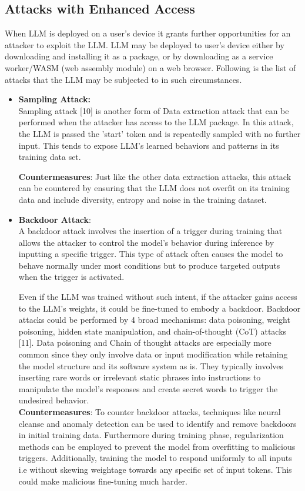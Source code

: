 \documentclass[12pt]{article}
\begin{document}
    \subsection{Attacks with Enhanced Access}
    When LLM is deployed on a user's device it grants further opportunities for an attacker to exploit the LLM. LLM may be deployed to user's device either by downloading and installing it as a package, or by downloading as a service worker/WASM (web assembly module) on a web browser. Following is the list of attacks that the LLM may be subjected to in such circumstances.
    \begin{itemize}
        \item \textbf{Sampling Attack:} \\
        Sampling attack [10] is another form of Data extraction attack that can be performed when the attacker has access to the LLM package. In this attack, the LLM is passed the 'start' token and is repeatedly sampled with no further input. This tends to expose LLM's learned behaviors and patterns in its training data set.

        \textbf{Countermeasures}: Just like the other data extraction attacks, this attack can be countered by ensuring that the LLM does not overfit on its training data and include diversity, entropy and noise in the training dataset.

        \item \textbf{Backdoor Attack}: \\
        A backdoor attack involves the insertion of a trigger during training that allows the attacker to control the model’s behavior during inference by inputting a specific trigger. This type of attack often causes the model to behave normally under most conditions but to produce targeted outputs when the trigger is activated.

        Even if the LLM was trained without such intent, if the attacker gains access to the LLM's weights, it could be fine-tuned to embody a backdoor. Backdoor attacks could be performed by 4 broad mechanisms: data poisoning, weight poisoning, hidden state manipulation, and chain-of-thought (CoT) attacks [11]. Data poisoning and Chain of thought attacks are especially more common since they only involve data or input modification while retaining the model structure and its software system as is. They typically involves inserting rare words or irrelevant static phrases into instructions
        to manipulate the model’s responses and create secret words to trigger the undesired behavior. \\
        \textbf{Countermeasures}: To counter backdoor attacks, techniques like neural cleanse and anomaly detection can be used to identify and remove backdoors in initial training data. Furthermore during training phase, regularization methods can be employed to prevent the model from overfitting to malicious triggers. Additionally, training the model to respond uniformly to all inputs i.e without skewing weightage towards any specific set of input tokens. This could make malicious fine-tuning much harder.\\


\end{itemize}
\end{document}
